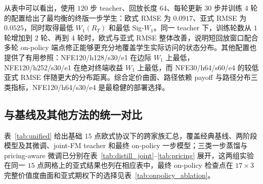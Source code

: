 \documentclass[11pt]{ctexart}
\begin{document}
从表中可以看出，使用 $120$ 步 teacher、回放长度 $64$、每轮更新 $30$ 步并训练 $4$ 轮的配置给出了最均衡的终版一步学生：欧式 RMSE 为 $0.0917$、亚式 RMSE 为 $0.0525$，同时取得最低 $W_1(R_T)$ 和最低 Sig-$W_1$。同一 teacher 下，训练轮数从 $1$ 轮增加到 $2$ 轮、再到 $4$ 轮时，欧式与亚式 RMSE 整体改善，说明短回放窗口配合多轮 on-policy 端点修正能够更充分地覆盖学生实际访问的状态分布。其他配置也提供了有用参照：NFE120/h128/s30/e1 在边际 $W_1$ 上最低，NFE120/h252/s30/e1 在绝对终端收益 $W_1$ 上最低，而 NFE30/h64/s60/e4 的较低亚式 RMSE 伴随更大的分布距离。综合定价曲面、路径依赖 payoff 与路径分布三类指标，NFE120/h64/s30/e4 是最稳健的部署选择。

\subsection{与基线及其他方法的统一对比}
\label{sec:res_baselines}
表~\ref{tab:unified} 给出基础 $15$ 点欧式协议下的跨家族汇总，覆盖经典基线、两阶段模型及其微调、joint-FM teacher 和最终 on-policy 一步模型；三类一步蒸馏与 pricing-aware 微调已分别在表~\ref{tab:distill_joint}--\ref{tab:pricing} 展开，这两组实验在同一 $15$ 点网格上的亚式结果也列在相应表中，最终 on-policy 检查点在 $17\times3$ 完整价值度曲面和亚式期权下的选择见表~\ref{tab:onpolicy_ablation}。
\end{document}

